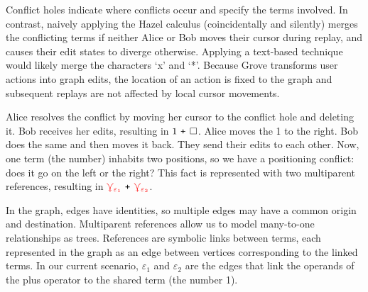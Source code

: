 \documentclass[nonacm, acmsmall, screen, review]{acmart}
\newcommand{\e}{\varepsilon}
\newcommand{\id}[1]{\textcolor{gray}{\ensuremath{#1}}}
\newcommand{\eid}[2]{{#2}^{\id{#1}}}
\newcommand{\eFun}[4]{\eid{#1}{\lambda}#2{:}#3{.}#4}
\newcommand{\ePlus}[3]{#2~\eid{#1}{\texttt{+}}~#3}
\newcommand{\eTimes}[3]{#2~\eid{#1}{\texttt{*}}~#3}
\newcommand{\hole}{\ensuremath{\square}} %
\newcommand{\multiVertex}[1]{\textcolor{red}{\ensuremath{\curlyveedownarrow_{#1}}}}
\begin{document}
Conflict holes indicate where conflicts occur and specify the terms involved.
In contrast, naively applying the Hazel calculus (coincidentally and silently) merges the conflicting terms if neither Alice or Bob moves their cursor during replay, 
and causes their edit states to diverge otherwise.
Applying a text-based technique would likely merge the characters `x' and `*'.
Because Grove transforms user actions into graph edits, the location of an action is fixed to the graph and subsequent replays are not affected by local cursor movements.


Alice resolves the conflict by moving her cursor to the conflict hole and deleting it.
Bob receives her edits, resulting in $\ePlus{}{1}{\hole}$.
Alice moves the 1 to the right.
Bob does the same and then moves it back.
They send their edits to each other.
Now, one term (the number) inhabits two positions, so we have a positioning conflict:
does it go on the left or the right?
This fact is represented with two multiparent references,
resulting in $\ePlus{}{\multiVertex{\e_1}}{\multiVertex{\e_2}}$.

In the graph, edges have identities, so multiple edges may have a common origin and destination.
Multiparent references allow us to model many-to-one relationships as trees.
References are symbolic links between terms, each represented in the graph as an edge between vertices corresponding to the linked terms.
In our current scenario, $\e_1$ and $\e_2$ are the edges that link the operands of the plus operator to the shared term (the number 1).

\end{document}
